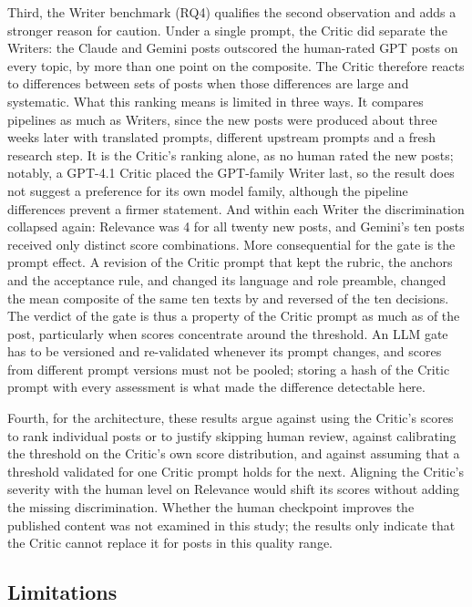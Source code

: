 \documentclass[a4paper,twoside]{article}
\begin{document}
Third, the Writer benchmark (RQ4) qualifies the second observation and adds a stronger reason for caution. Under a single prompt, the Critic did separate the Writers: the Claude and Gemini posts outscored the human-rated GPT posts on every topic, by more than one point on the composite. The Critic therefore reacts to differences between sets of posts when those differences are large and systematic. What this ranking means is limited in three ways. It compares pipelines as much as Writers, since the new posts were produced about three weeks later with translated prompts, different upstream prompts and a fresh research step. It is the Critic's ranking alone, as no human rated the new posts; notably, a GPT-4.1 Critic placed the GPT-family Writer last, so the result does not suggest a preference for its own model family, although the pipeline differences prevent a firmer statement. And within each Writer the discrimination collapsed again: Relevance was 4 for all twenty new posts, and Gemini's ten posts received only \BmGemVectors{} distinct score combinations. More consequential for the gate is the prompt effect. A revision of the Critic prompt that kept the rubric, the anchors and the acceptance rule, and changed its language and role preamble, changed the mean composite of the same ten texts by \BmShiftComp{} and reversed \BmShiftDecisions{} of the ten decisions. The verdict of the gate is thus a property of the Critic prompt as much as of the post, particularly when scores concentrate around the threshold. An LLM gate has to be versioned and re-validated whenever its prompt changes, and scores from different prompt versions must not be pooled; storing a hash of the Critic prompt with every assessment is what made the difference detectable here.

Fourth, for the architecture, these results argue against using the Critic's scores to rank individual posts or to justify skipping human review, against calibrating the threshold on the Critic's own score distribution, and against assuming that a threshold validated for one Critic prompt holds for the next. Aligning the Critic's severity with the human level on Relevance would shift its scores without adding the missing discrimination. Whether the human checkpoint improves the published content was not examined in this study; the results only indicate that the Critic cannot replace it for posts in this quality range.

\subsection{Limitations}
\label{sec:limitations}
\end{document}
